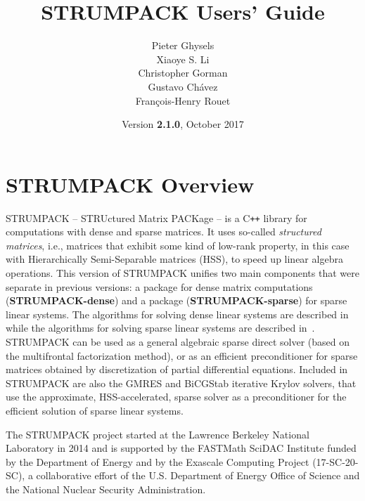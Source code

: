 \documentclass{article}
\title{\textbf{STRUMPACK Users' Guide}}
\author{Pieter Ghysels\footnotemark[1] \\
  Xiaoye S. Li\footnotemark[1] \\
  Christopher Gorman\footnotemark[2] \\
  Gustavo Ch\'{a}vez\footnotemark[1] \\
  Fran\c{c}ois-Henry Rouet\footnotemark[3]}
\date{Version \textbf{2.1.0}, October 2017}
\begin{document}
\maketitle

\vfill


\pagebreak

\tableofcontents

\pagebreak
\section{STRUMPACK Overview}
STRUMPACK -- STRUctured Matrix PACKage -- is a C\texttt{++} library
for computations with dense and sparse matrices. It uses so-called
\emph{structured matrices}, i.e., matrices that exhibit some kind of
low-rank property, in this case with Hierarchically Semi-Separable
matrices (HSS), to speed up linear algebra operations.  This version
of STRUMPACK unifies two main components that were separate in
previous versions: a package for dense matrix computations
(\textbf{STRUMPACK-dense}) and a package (\textbf{STRUMPACK-sparse})
for sparse linear systems. The algorithms for solving dense linear
systems are described in~\cite{rouet2014distributed} while the
algorithms for solving sparse linear systems are described
in~\cite{ghysels2015sparse,ghysels2017sparse}. STRUMPACK can be used
as a general algebraic sparse direct solver (based on the multifrontal
factorization method), or as an efficient preconditioner for sparse
matrices obtained by discretization of partial differential
equations. Included in STRUMPACK are also the GMRES and BiCGStab
iterative Krylov solvers, that use the approximate, HSS-accelerated,
sparse solver as a preconditioner for the efficient solution of sparse
linear systems.

The STRUMPACK project started at the Lawrence Berkeley National
Laboratory in 2014 and is supported by the FASTMath SciDAC Institute
funded by the Department of Energy and by the Exascale Computing
Project (17-SC-20-SC), a collaborative effort of the U.S. Department
of Energy Office of Science and the National Nuclear Security
Administration.
\end{document}
